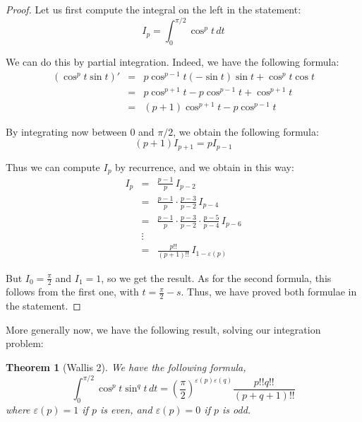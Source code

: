 \documentclass[12pt]{amsbook}
\newtheorem{theorem}{Theorem}[chapter]
\begin{document}
\begin{proof}
Let us first compute the integral on the left in the statement:
$$I_p=\int_0^{\pi/2}\cos^pt\,dt$$

We can do this by partial integration. Indeed, we have the following formula:
\begin{eqnarray*}
(\cos^pt\sin t)'
&=&p\cos^{p-1}t(-\sin t)\sin t+\cos^pt\cos t\\
&=&p\cos^{p+1}t-p\cos^{p-1}t+\cos^{p+1}t\\
&=&(p+1)\cos^{p+1}t-p\cos^{p-1}t
\end{eqnarray*}

By integrating now between $0$ and $\pi/2$, we obtain the following formula:
$$(p+1)I_{p+1}=pI_{p-1}$$

Thus we can compute $I_p$ by recurrence, and we obtain in this way:
\begin{eqnarray*}
I_p
&=&\frac{p-1}{p}\,I_{p-2}\\
&=&\frac{p-1}{p}\cdot\frac{p-3}{p-2}\,I_{p-4}\\
&=&\frac{p-1}{p}\cdot\frac{p-3}{p-2}\cdot\frac{p-5}{p-4}\,I_{p-6}\\
&\vdots&\\
&=&\frac{p!!}{(p+1)!!}\,I_{1-\varepsilon(p)}
\end{eqnarray*}

But $I_0=\frac{\pi}{2}$ and $I_1=1$, so we get the result. As for the second formula, this follows from the first one, with $t=\frac{\pi}{2}-s$. Thus, we have proved both formulae in the statement.
\end{proof}

More generally now, we have the following result, solving our integration problem:


\begin{theorem}[Wallis 2]
We have the following formula,
$$\int_0^{\pi/2}\cos^pt\sin^qt\,dt=\left(\frac{\pi}{2}\right)^{\varepsilon(p)\varepsilon(q)}\frac{p!!q!!}{(p+q+1)!!}$$
where $\varepsilon(p)=1$ if $p$ is even, and $\varepsilon(p)=0$ if $p$ is odd.
\end{theorem}
\end{document}
